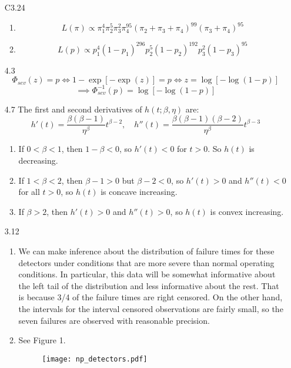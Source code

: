 \documentclass[12pt]{article}\usepackage[]{graphicx}\usepackage[]{color}
\begin{document}
\begin{enumerate}
\item[C3.24]
\begin{enumerate}
  \item
  \[L(\pi) \propto \pi_1^4 \pi_2^5 \pi_3^2 \pi_4^{95} (\pi_2+\pi_3+\pi_4)^{99} (\pi_3+\pi_4)^{95} \]
  \item
  \[L(p) \propto p_1^4 (1-p_1)^{296} p_2^5 (1-p_2)^{192} p_3^2 (1-p_3)^{95}\]
\end{enumerate}
\item[4.3]
\[\Phi_{sev}(z) = p \iff 1-\exp[-\exp(z)] = p \iff z=\log[-\log(1-p)]\]
\[\implies \Phi_{sev}^{-1}(p) = \log[-\log(1-p)]\]
\item[4.7]
The first and second derivatives of $h(t;\beta,\eta)$ are:
\[h'(t) = \frac{\beta(\beta-1)}{\eta^{\beta}}t^{\beta-2},\quad h''(t) =\frac{\beta(\beta-1)(\beta-2)}{\eta^{\beta}}t^{\beta-3}\]
\begin{enumerate}
  \item If $0<\beta<1$, then $1-\beta<0$, so $h'(t)<0$ for $t>0$. So $h(t)$ is decreasing.
  \item If $1<\beta<2$, then $\beta-1>0$ but $\beta-2<0$, so $h'(t)>0$ and $h''(t)<0$ for all $t>0$, so $h(t)$ is concave increasing.
  \item If $\beta>2$, then $h'(t)>0$ and $h''(t)>0$, so $h(t)$ is convex increasing.
\end{enumerate}

\item[3.12]
\begin{enumerate}
  \item
  We can make inference about the distribution of failure times for these detectors under conditions that are more severe than normal operating conditions. In particular, this data will be somewhat informative about the left tail of the distribution and less informative about the rest. That is because 3/4 of the failure times are right censored. On the other hand, the intervals for the interval censored observations are fairly small, so the seven failures are observed with reasonable precision.
  
  \item See Figure 1.
  \begin{figure}
    \texttt{[image: np\_detectors.pdf]}
    

\end{figure}
\end{enumerate}
\end{enumerate}
\end{document}
